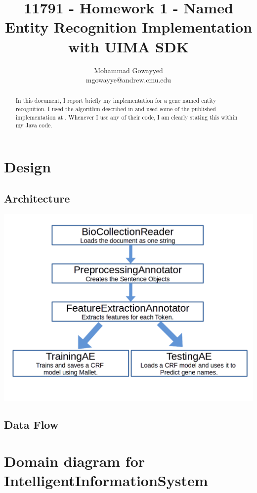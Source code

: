 \documentclass{article}
\begin{document}
\title{11791 - Homework 1 - Named Entity Recognition Implementation with UIMA SDK}
\author{Mohammad Gowayyed \\ mgowayye@andrew.cmu.edu}

\maketitle
\begin{abstract}
In this document, I report briefly my implementation for a gene named entity recognition. I used the algorithm described in \cite{banner} and used some of the published implementation at \cite{banner_code}. Whenever I use any of their code, I am clearly stating this within my Java code.
\end{abstract}


\section{Design}
\subsection{Architecture}

\includegraphics[width=14cm]{framework.png}

\subsection{Data Flow}

\section{Domain diagram for IntelligentInformationSystem}
\end{document}
